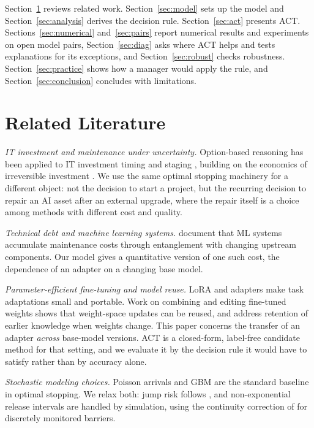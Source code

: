 \documentclass[preprint,12pt,authoryear]{elsarticle}
\begin{document}
Section~\ref{sec:lit} reviews related work. Section~\ref{sec:model} sets up the model and Section~\ref{sec:analysis} derives the
decision rule. Section~\ref{sec:act} presents ACT. Sections~\ref{sec:numerical} and~\ref{sec:pairs} report numerical results and experiments on open
model pairs, Section~\ref{sec:diag} asks where ACT helps and tests explanations for its exceptions, and Section~\ref{sec:robust} checks robustness.
Section~\ref{sec:practice} shows how a manager would apply the rule, and Section~\ref{sec:conclusion} concludes with limitations.

\section{Related Literature}\label{sec:lit}

\emph{IT investment and maintenance under uncertainty.} Option-based reasoning has been applied to IT investment
timing and staging \citep{benaroch1999case,benaroch2002managing}, building on the economics of irreversible
investment \citep{mcdonald1986value,dixit1994investment}. We use the same optimal stopping machinery for a
different object: not the decision to start a project, but the recurring decision to repair an AI asset after an
external upgrade, where the repair itself is a choice among methods with different cost and quality.

\emph{Technical debt and machine learning systems.} \citet{sculley2015hidden} document that ML systems accumulate
maintenance costs through entanglement with changing upstream components. Our model gives a quantitative version of
one such cost, the dependence of an adapter on a changing base model.

\emph{Parameter-efficient fine-tuning and model reuse.} LoRA \citep{hu2022lora} and adapters \citep{houlsby2019parameter}
make task adaptations small and portable. Work on combining and editing fine-tuned weights
\citep{ilharco2023editing} shows that weight-space updates can be reused, and \citet{kirkpatrick2017overcoming}
address retention of earlier knowledge when weights change. This paper concerns the transfer of an adapter \emph{across} base-model versions. ACT is a closed-form, label-free candidate method for that setting, and we evaluate it by the decision rule it would have to satisfy rather than by accuracy alone.

\emph{Stochastic modeling choices.} Poisson arrivals and GBM are the standard baseline in optimal stopping. We relax
both: jump risk follows \citet{merton1976option}, and non-exponential release intervals are handled by simulation,
using the continuity correction of \citet{broadie1997continuity} for discretely monitored barriers.
\end{document}
